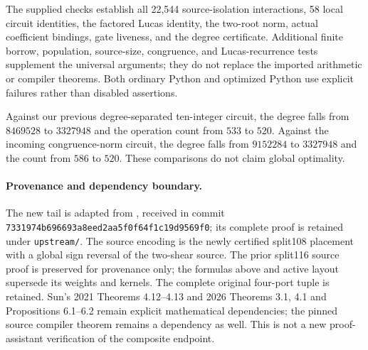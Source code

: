 The supplied checks establish all 22,544 source-isolation interactions, 58 local circuit identities, the factored Lucas identity, the two-root norm, actual coefficient bindings, gate liveness, and the degree certificate. Additional finite borrow, population, source-size, congruence, and Lucas-recurrence tests supplement the universal arguments; they do not replace the imported arithmetic or compiler theorems. Both ordinary Python and optimized Python use explicit failures rather than disabled assertions.

Against our previous degree-separated ten-integer circuit, the degree falls from $8469528$ to $3327948$ and the operation count from $533$ to $520$. Against the incoming congruence-norm circuit, the degree falls from $9152284$ to $3327948$ and the count from $586$ to $520$. These comparisons do not claim global optimality.

\paragraph{Provenance and dependency boundary.}
The new tail is adapted from , received in commit \texttt{7331974b696693a8eed2\allowbreak aa5f0f64f1c19d9569f0}; its complete proof is retained under \texttt{upstream/}. The source encoding is the newly certified split108 placement with a global sign reversal of the two-shear source. The prior split116 source proof is preserved for provenance only; the formulas above and active layout supersede its weights and kernels. The complete original four-port tuple is retained. Sun's 2021 Theorems 4.12--4.13 and 2026 Theorems 3.1, 4.1 and Propositions 6.1--6.2 remain explicit mathematical dependencies; the pinned source compiler theorem remains a dependency as well. This is not a new proof-assistant verification of the composite endpoint.
